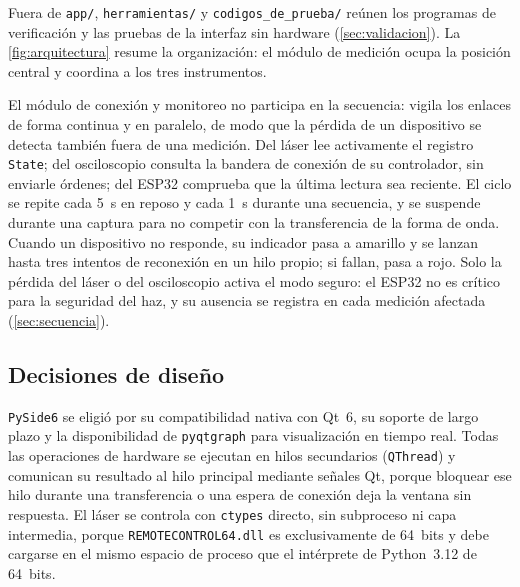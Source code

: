 Fuera de \texttt{app/}, \texttt{herramientas/} y
\texttt{codigos\_de\_prueba/} reúnen los programas de verificación y las
pruebas de la interfaz sin hardware (\cref{sec:validacion}). La
\cref{fig:arquitectura} resume la organización: el módulo de medición
ocupa la posición central y coordina a los tres instrumentos.



El módulo de conexión y monitoreo no participa en la secuencia: vigila
los enlaces de forma continua y en paralelo, de modo que la pérdida de
un dispositivo se detecta también fuera de una medición. Del láser lee
activamente el registro \texttt{State}; del osciloscopio consulta la
bandera de conexión de su controlador, sin enviarle órdenes; del ESP32
comprueba que la última lectura sea reciente. El ciclo se repite cada
\SI{5}{\second} en reposo y cada \SI{1}{\second} durante una secuencia,
y se suspende durante una captura para no competir con la transferencia
de la forma de onda. Cuando un dispositivo no responde, su indicador
pasa a amarillo y se lanzan hasta tres intentos de reconexión en un
hilo propio; si fallan, pasa a rojo. Solo la pérdida del láser o del
osciloscopio activa el modo seguro: el ESP32 no es crítico para la
seguridad del haz, y su ausencia se registra en cada medición afectada
(\cref{sec:secuencia}).

\subsection{Decisiones de diseño}
\label{sec:decisiones}

\texttt{PySide6} se eligió por su compatibilidad nativa con Qt~6, su
soporte de largo plazo y la disponibilidad de \texttt{pyqtgraph} para
visualización en tiempo real. Todas las operaciones de hardware se
ejecutan en hilos secundarios (\texttt{QThread}) y comunican su
resultado al hilo principal mediante señales Qt, porque bloquear ese hilo
durante una transferencia o una espera de conexión deja la ventana sin
respuesta. El láser se controla con \texttt{ctypes} directo, sin
subproceso ni capa intermedia, porque \texttt{REMOTECONTROL64.dll} es
exclusivamente de 64~bits y debe cargarse en el mismo espacio de proceso
que el intérprete de Python~3.12 de 64~bits.

